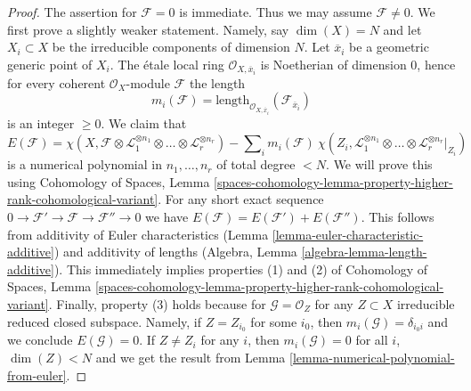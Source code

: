 \begin{proof}
The assertion for $\mathcal{F} = 0$ is immediate. Thus we may assume
$\mathcal{F} \not = 0$.
We first prove a slightly weaker statement. Namely, say
$\dim(X) = N$ and let $X_i \subset X$ be the irreducible
components of dimension $N$. Let $\overline{x}_i$ be a geometric
generic point of $X_i$. The \'etale local ring
$\mathcal{O}_{X, \overline{x}_i}$ is Noetherian of
dimension $0$, hence for every coherent $\mathcal{O}_X$-module
$\mathcal{F}$ the length
$$
m_i(\mathcal{F}) = \text{length}_{\mathcal{O}_{X, \overline{x}_i}}
(\mathcal{F}_{\overline{x}_i})
$$
is an integer $\geq 0$. We claim that
$$
E(\mathcal{F}) =
\chi(X, \mathcal{F} \otimes \mathcal{L}_1^{\otimes n_1} \otimes \ldots \otimes
\mathcal{L}_r^{\otimes n_r}) -
\sum\nolimits_i
m_i(\mathcal{F})\ \chi(Z_i, \mathcal{L}_1^{\otimes n_1} \otimes \ldots \otimes
\mathcal{L}_r^{\otimes n_r}|_{Z_i})
$$
is a numerical polynomial in $n_1, \ldots, n_r$ of total degree $< N$.
We will prove this using Cohomology of Spaces, Lemma
\ref{spaces-cohomology-lemma-property-higher-rank-cohomological-variant}.
For any short exact sequence $0 \to \mathcal{F}' \to \mathcal{F} \to
\mathcal{F}'' \to 0$ we have
$E(\mathcal{F}) = E(\mathcal{F}') + E(\mathcal{F}'')$.
This follows from additivity of Euler characteristics
(Lemma \ref{lemma-euler-characteristic-additive})
and additivity of lengths
(Algebra, Lemma \ref{algebra-lemma-length-additive}).
This immediately implies properties (1) and (2) of Cohomology of Spaces, Lemma
\ref{spaces-cohomology-lemma-property-higher-rank-cohomological-variant}.
Finally, property (3) holds because for $\mathcal{G} = \mathcal{O}_Z$
for any $Z \subset X$ irreducible reduced closed subspace.
Namely, if $Z = Z_{i_0}$ for some $i_0$, then
$m_i(\mathcal{G}) = \delta_{i_0i}$ and we conclude $E(\mathcal{G}) = 0$.
If $Z \not = Z_i$ for any $i$, then $m_i(\mathcal{G}) = 0$ for all $i$,
$\dim(Z) < N$ and we get the result from
Lemma \ref{lemma-numerical-polynomial-from-euler}.


\end{proof}
